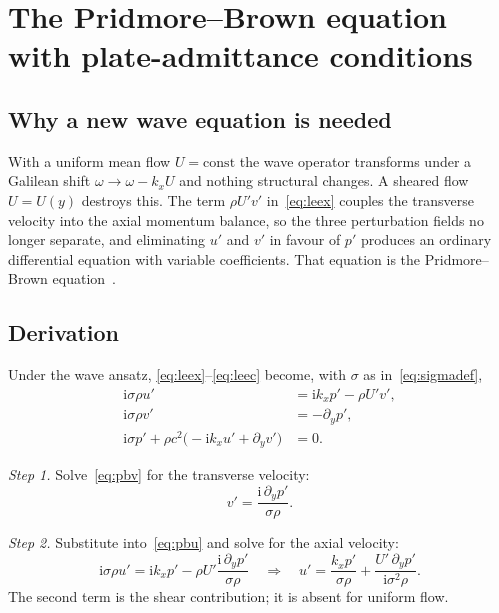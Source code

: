 \documentclass[11pt,a4paper]{article}
\newcommand{\ii}{\mathrm{i}}
\theoremstyle{plain}
\theoremstyle{remark}
\begin{document}
\section{The Pridmore--Brown equation with plate-admittance conditions}\label{sec:pb}

\subsection{Why a new wave equation is needed}
With a uniform mean flow $U=\text{const}$ the wave operator transforms under a Galilean shift
$\omega\to\omega-k_xU$ and nothing structural changes. A sheared flow $U=U(y)$ destroys this. The term
$\rho U'v'$ in~\eqref{eq:leex} couples the transverse velocity into the axial momentum balance, so the
three perturbation fields no longer separate, and eliminating $u'$ and $v'$ in favour of $p'$ produces
an ordinary differential equation with variable coefficients. That equation is the Pridmore--Brown
equation~\cite{pridmorebrown}.

\subsection{Derivation}
Under the wave ansatz, \eqref{eq:leex}--\eqref{eq:leec} become, with $\sigma$ as
in~\eqref{eq:sigmadef},
\begin{align}
\ii\sigma\rho u'&=\ii k_xp'-\rho U'v',
\label{eq:pbu}\\
\ii\sigma\rho v'&=-\partial_yp',
\label{eq:pbv}\\
\ii\sigma p'+\rho c^2\bigl(-\ii k_xu'+\partial_yv'\bigr)&=0 .
\label{eq:pbc}
\end{align}

\emph{Step 1.} Solve~\eqref{eq:pbv} for the transverse velocity:
\begin{equation}
v'=\frac{\ii\,\partial_yp'}{\sigma\rho}.
\label{eq:vfromp}
\end{equation}

\emph{Step 2.} Substitute into~\eqref{eq:pbu} and solve for the axial velocity:
\begin{equation}
\ii\sigma\rho u'=\ii k_xp'-\rho U'\frac{\ii\,\partial_yp'}{\sigma\rho}
\quad\Longrightarrow\quad
u'=\frac{k_xp'}{\sigma\rho}+\frac{U'\,\partial_yp'}{\ii\sigma^2\rho}.
\label{eq:ufromp}
\end{equation}
The second term is the shear contribution; it is absent for uniform flow.
\end{document}
